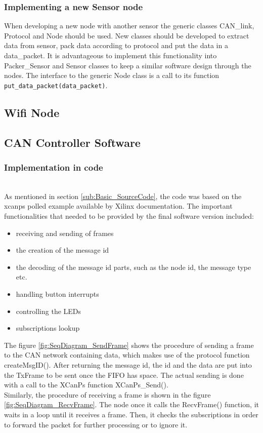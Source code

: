 \subsubsection*{Implementing a new Sensor node}
When developing a new node with another sensor the generic classes CAN\_link, Protocol and Node should be used. 
New classes should be developed to extract data from sensor, pack data according to protocol and put the data in a data\_packet.
It is advantageous to implement this functionality into Packer\_Sensor and Sensor classes to keep a similar software design through the nodes.
The interface to the generic Node class is a call to its function \texttt{put\_data\_packet(data\_packet)}.

\subsection{Wifi Node}


\subsection{CAN Controller Software}
\subsubsection{Implementation in code}~\\
As mentioned in section \ref{sub:Basic_SourceCode}, the code was based on the xcanps polled example available by Xilinx documentation.
The important functionalities that needed to be provided by the final software version included:

\begin{itemize}
\item receiving and sending of frames
\item the creation of the message id
\item the decoding of the message id parts, such as the node id, the message type etc. 
\item handling button interrupts
\item controlling the LEDs
\item subscriptions lookup
\end{itemize}
The figure \ref{fig:SeqDiagram_SendFrame} shows the procedure of sending a frame to the CAN network containing data, which makes use of the protocol function createMsgID().
After returning the message id, the id and the data are put into the TxFrame to be sent once the FIFO has space.
The actual sending is done with a call to the XCanPs function XCanPs\_Send().
\\
Similarly, the procedure of receiving a frame is shown in the figure \ref{fig:SeqDiagram_RecvFrame}.
The node once it calls the RecvFrame() function, it waits in a loop until it receives a frame. Then, it checks the subscriptions in order to forward the packet for further processing or to ignore it.



